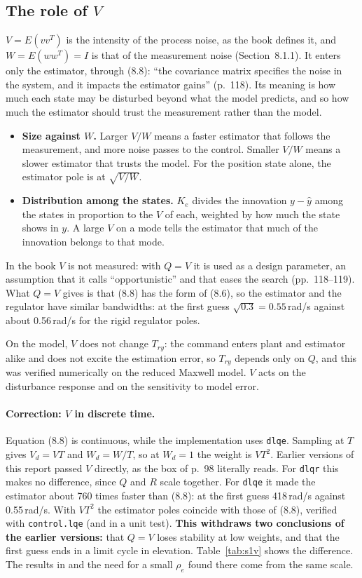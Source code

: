 \documentclass[10pt,a4paper]{article}
\numberwithin{equation}{section}
\begin{document}
\subsection{The role of $V$}\label{sec:v}
$V=E(vv^T)$ is the intensity of the process noise, as the book defines it, and $W=E(ww^T)=I$ is that of the measurement noise (Section~8.1.1). It enters only the estimator, through (8.8): ``the covariance matrix specifies the noise in the system, and it impacts the estimator gains'' (p.~118). Its meaning is how much each state may be disturbed beyond what the model predicts, and so how much the estimator should trust the measurement rather than the model.
\begin{itemize}
\item \textbf{Size against $W$.} Larger $V/W$ means a faster estimator that follows the measurement, and more noise passes to the control. Smaller $V/W$ means a slower estimator that trusts the model. For the position state alone, the estimator pole is at $\sqrt{V/W}$.
\item \textbf{Distribution among the states.} $K_e$ divides the innovation $y-\hat y$ among the states in proportion to the $V$ of each, weighted by how much the state shows in $y$. A large $V$ on a mode tells the estimator that much of the innovation belongs to that mode.
\end{itemize}
In the book $V$ is not measured: with $Q=V$ it is used as a design parameter, an assumption that it calls ``opportunistic'' and that eases the search (pp.~118--119). What $Q=V$ gives is that (8.8) has the form of (8.6), so the estimator and the regulator have similar bandwidths: at the first guess $\sqrt{0.3}=0.55$\,rad/s against about 0.56\,rad/s for the rigid regulator poles.

On the model, $V$ does not change $T_{ry}$: the command enters plant and estimator alike and does not excite the estimation error, so $T_{ry}$ depends only on $Q$, and this was verified numerically on the reduced Maxwell model. $V$ acts on the disturbance response and on the sensitivity to model error.

\paragraph{Correction: $V$ in discrete time.} Equation (8.8) is continuous, while the implementation uses \texttt{dlqe}. Sampling at $T$ gives $V_d=VT$ and $W_d=W/T$, so at $W_d=1$ the weight is $VT^2$. Earlier versions of this report passed $V$ directly, as the box of p.~98 literally reads. For \texttt{dlqr} this makes no difference, since $Q$ and $R$ scale together. For \texttt{dlqe} it made the estimator about 760 times faster than (8.8): at the first guess 418\,rad/s against 0.55\,rad/s. With $VT^2$ the estimator poles coincide with those of (8.8), verified with \texttt{control.lqe} (and in a unit test). \textbf{This withdraws two conclusions of the earlier versions:} that $Q=V$ loses stability at low weights, and that the first guess ends in a limit cycle in elevation. Table~\ref{tab:s1v} shows the difference. The results in  and the need for a small $\rho_e$ found there come from the same scale.
\end{document}
